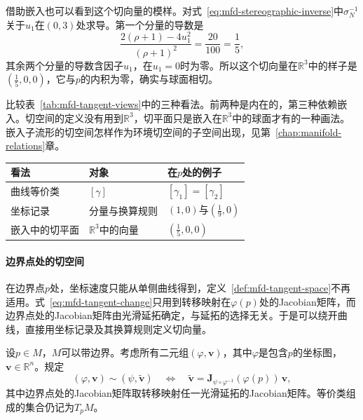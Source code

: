 借助嵌入也可以看到这个切向量的模样。对式~\eqref{eq:mfd-stereographic-inverse}中$\sigma_N^{-1}$关于$u_1$在$(0,3)$处求导。第一个分量的导数是
\[
\frac{2(\rho+1)-4u_1^2}{(\rho+1)^2}=\frac{20}{100}=\frac15,
\]
其余两个分量的导数含因子$u_1$，在$u_1=0$时为零。所以这个切向量在$\mathbb R^3$中的样子是$(\tfrac15,0,0)$，它与$p$的内积为零，确实与球面相切。

比较表~\ref{tab:mfd-tangent-views}中的三种看法。前两种是内在的，第三种依赖嵌入。切空间的定义没有用到$\mathbb R^3$，切平面只是嵌入在$\mathbb R^3$中的球面才有的一种画法。嵌入子流形的切空间怎样作为环境切空间的子空间出现，见第~\ref{chap:manifold-relations}章。

\begin{BookInlineTable}
  \centering
  \begin{tabular}{lll}
    \toprule
    看法 & 对象 & 在$p$处的例子\\
    \midrule
    曲线等价类 & $[\gamma]$ & $[\gamma_1]=[\gamma_2]$\\
    坐标记录 & 分量与换算规则 & $(1,0)$与$(\tfrac19,0)$\\
    嵌入中的切平面 & $\mathbb R^3$中的向量 & $(\tfrac15,0,0)$\\
    \bottomrule
  \end{tabular}
  \caption{切向量的三种看法，前两种不需要外部空间。}
  \label{tab:mfd-tangent-views}
\end{BookInlineTable}

\paragraph{边界点处的切空间}
在边界点$p$处，坐标速度只能从单侧曲线得到，定义~\ref{def:mfd-tangent-space}不再适用。式~\eqref{eq:mfd-tangent-change}只用到转移映射在$\varphi(p)$处的Jacobian矩阵，而边界点处的Jacobian矩阵由光滑延拓确定，与延拓的选择无关。于是可以绕开曲线，直接用坐标记录及其换算规则定义切向量。

\begin{definition}[用坐标记录定义的切空间]
\label{def:mfd-tangent-records}
设$p\in M$，$M$可以带边界。考虑所有二元组$(\varphi,\bm v)$，其中$\varphi$是包含$p$的坐标图，$\bm v\in\mathbb R^n$。规定
\begin{equation}
(\varphi,\bm v)\sim(\psi,\tilde{\bm v})\quad\Longleftrightarrow\quad
\tilde{\bm v}=\bm J_{\psi\circ\varphi^{-1}}(\varphi(p))\,\bm v,
\label{eq:mfd-tangent-records}
\end{equation}
其中边界点处的Jacobian矩阵取转移映射任一光滑延拓的Jacobian矩阵。等价类组成的集合仍记为$T_pM$。
\end{definition}

